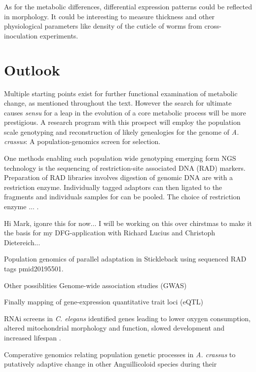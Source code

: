 As for the metabolic differences, differential expression patterns
could be reflected in morphology. It could be interesting to measure
thickness and other physiological parameters like density of the
cuticle of worms from cross-inoculation experiments.

\section{Outlook}

Multiple starting points exist for further functional examination of
metabolic change, as mentioned throughout the text. However the search
for ultimate causes \textit{sensu} \cite{mayr1961cause} for a leap in
the evolution of a core metabolic process will be more prestigious. A
research program with this prospect will employ the population scale
genotyping and reconstruction of likely genealogies for the genome of
\textit{A. crassus}: A population-genomics screen for selection.

One methods enabling such population wide genotyping emerging form
NGS technology is the sequencing of restriction-site associated DNA
(RAD) markers. Preparation of RAD libraries involves digestion of
genomic DNA are with a restriction enzyme. Individually tagged
adaptors can then ligated to the fragments and individuals samples for
can be pooled. The choice of restriction enzyme ...  \cite{pmid18852878}.


Hi Mark, igonre this for now...  I will be working on this over
chirstmas to make it the basis for my DFG-application with Richard
Lucius and Christoph Dietereich...

Population genomics of parallel adaptation in Stickleback using
sequenced RAD tags {pmid20195501}.


Other possiblities Genome-wide association studies (GWAS)

Finally mapping of gene-expression quantitative trait loci (eQTL) 

RNAi screens in \textit{C. elegans} identified genes leading to lower
oxygen consumption, altered mitochondrial morphology and function,
slowed development and increased lifespan \cite{pmid12447374}.

Comperative genomics relating population genetic processes in
\textit{A. crassus} to putatively adaptive change in other
Anguillicoloid species during their 



